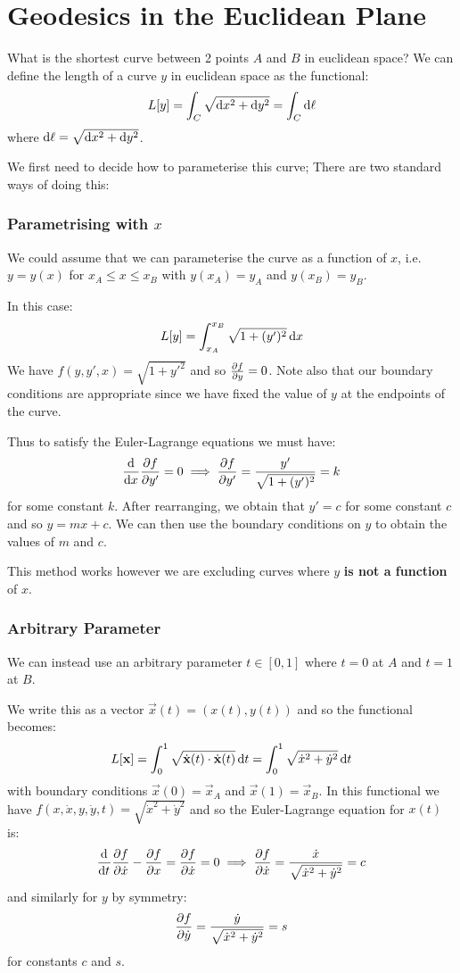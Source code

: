 \documentclass[../main.tex]{subfiles}
\begin{document}
\section{Geodesics in the Euclidean Plane} \label{geodesicSec}
What is the shortest curve between 2 points $A$ and $B$ in euclidean space?
We can define the length of a curve $y$ in euclidean space as the functional:
\[
  L[y] = \int_{C} \sqrt{\d{x}^2 + \d{y}^2} = \int_{C}  \d{\ell}
\]
where $\d{\ell} = \sqrt{\d{x}^2 + \d{y}^2}$.

We first need to decide how to parameterise this curve;
There are two standard ways of doing this:
\subsubsection{Parametrising with $x$}
We could assume that we can parameterise the curve as a function of $x$, i.e. $y = y(x)$ for $x_A \leq x \leq x_B$ with $y(x_A) = y_A$ and $y(x_B) = y_B$.

In this case:
\[
  L[y] = \int_{x_A}^{x_B} \sqrt{1 + (y')^2} \d{x}
\]
We have $f(y, y', x) = \sqrt{1 + {y'}^2}$ and so $\pderiv{f}{y} = 0$.
Note also that our boundary conditions are appropriate since we have fixed the value of $y$ at the endpoints of the curve.

Thus to satisfy the Euler-Lagrange equations we must have:
\[
  \deriv{}{x} \pderiv{f}{y'} = 0 \implies \pderiv{f}{y'} = \frac{y'}{\sqrt{1 + (y')^2}} = k
\]
for some constant $k$.
After rearranging, we obtain that $y' = c$ for some constant $c$ and so $y = mx + c$.
We can then use the boundary conditions on $y$ to obtain the values of $m$ and $c$.

This method works however we are excluding curves where $y$ \textbf{is not a function} of $x$.
\subsubsection{Arbitrary Parameter}
We can instead use an arbitrary parameter $t \in [0, 1]$ where $t = 0$ at $A$ and $t = 1$ at $B$.

We write this as a vector $\vec{x}(t) = (x(t), y(t))$ and so the functional becomes:
\[
  L[\vec{x}] = \int_{0}^{1} \sqrt{\dot{\vec{x}}(t) \cdot \dot{\vec{x}}(t)} \d{t} = \int_{0}^{1} \sqrt{\dot{x}^2 + \dot{y}^2} \d{t}
\]
with boundary conditions $\vec{x}(0) = \vec{x}_A$ and $\vec{x}(1) = \vec{x}_B$.
In this functional we have $f(x, \dot{x}, y, \dot{y}, t) = \sqrt{\dot{x}^2 + \dot{y}^2}$ and so the Euler-Lagrange equation for $x(t)$ is:
\[
  \deriv{}{t} \pderiv{f}{\dot{x}} - \pderiv{f}{x} = \pderiv{f}{\dot{x}} = 0 \implies \pderiv{f}{\dot{x}} = \frac{\dot{x}}{\sqrt{\dot{x}^2 + \dot{y}^2}}= c
\]
and similarly for $y$ by symmetry:
\[
  \pderiv{f}{\dot{y}} = \frac{\dot{y}}{\sqrt{\dot{x}^2 + \dot{y}^2}} = s
\]
for constants $c$ and $s$.
\end{document}
